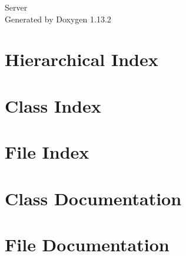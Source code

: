 \documentclass[twoside]{book}
\newcommand{\+}{\discretionary{\mbox{\scriptsize$\hookleftarrow$}}{}{}}
\newcommand{\clearemptydoublepage}{%
    \newpage{\pagestyle{empty}\cleardoublepage}%
  }
\begin{document}
  \raggedbottom
    \hypersetup{pageanchor=false,
                bookmarksnumbered=true,
                pdfencoding=unicode
               }
  \begin{titlepage}
  \vspace*{7cm}
  \begin{center}%
  {\Large Server}\\
  \vspace*{1cm}
  {\large Generated by Doxygen 1.13.2}\\
  \end{center}
  \end{titlepage}
  \clearemptydoublepage
  \tableofcontents
  \clearemptydoublepage
  \hypersetup{pageanchor=true}
\chapter{Hierarchical Index}

\chapter{Class Index}

\chapter{File Index}

\chapter{Class Documentation}



\chapter{File Documentation}







  \backmatter
  \newpage
  \clearemptydoublepage
  \printindex
\end{document}
